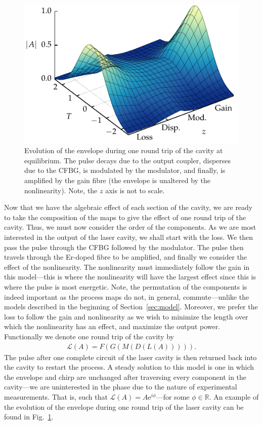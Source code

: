 \documentclass[9pt,twocolumn,twoside]{osajnl}
\begin{document}
\begin{figure}[tbp]
	\centering
	\includegraphics{Figures/Evo}
	\caption{Evolution of the envelope during one round trip of the cavity at equilibrium. The pulse decays due to the output coupler, disperses due to the CFBG, is modulated by the modulator, and finally, is amplified by the gain fibre (the envelope is unaltered by the nonlinearity). Note, the $z$ axis is not to scale.}
	\label{fig:cavityevo}
\end{figure}

Now that we have the algebraic effect of each section of the cavity, we are ready to take the composition of the maps to give the effect of one round trip of the cavity. Thus, we must now consider the order of the components. As we are most interested in the output of the laser cavity, we shall start with the loss. We then pass the pulse through the CFBG followed by the modulator. The pulse then travels through the Er-doped fibre to be amplified, and finally we consider the effect of the nonlinearity. The nonlinearity must immediately follow the gain in this model---this is where the nonlinearity will have the largest effect since this is where the pulse is most energetic. Note, the permutation of the components is indeed important as the process maps do not, in general, commute---unlike the models described in the beginning of Section~\ref{sec:model}. Moreover, we prefer the loss to follow the gain and nonlinearity as we wish to minimize the length over which the nonlinearity has an effect, and maximize the output power. Functionally we denote one round trip of the cavity by
\begin{align}
	\mathcal{L}(A) = F(G(M(D(L(A))))).
	\label{eq:order}
\end{align}
 The pulse after one complete circuit of the laser cavity is then returned back into the cavity to restart the process. A steady solution to this model is one in which the envelope and chirp are unchanged after traversing every component in the cavity---we are uninterested in the phase due to the nature of experimental measurements. That is, such that $\mathcal{L}(A) = A \textrm{e}^{i \phi}$---for some $\phi \in \mathbb{R}$. An example of the evolution of the envelope during one round trip of the laser cavity can be found in Fig.~\ref{fig:cavityevo}.
\end{document}
